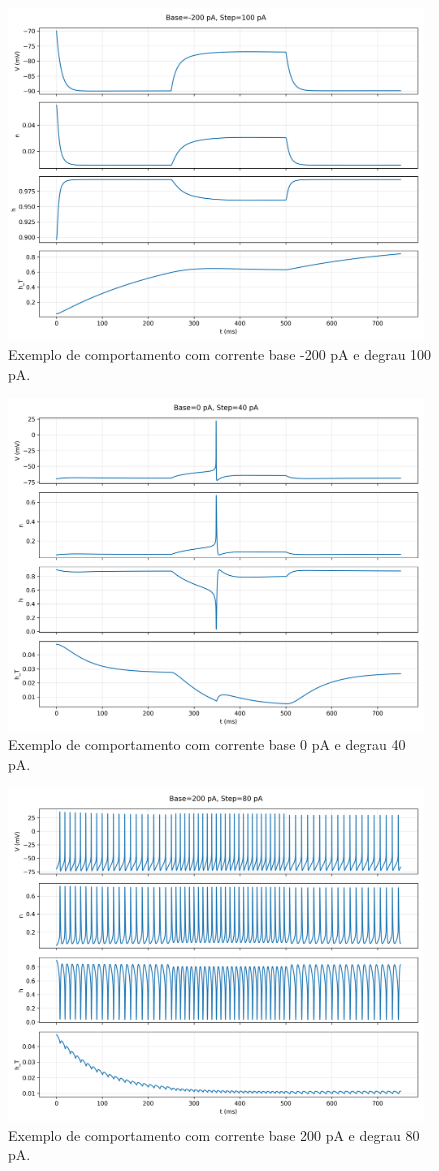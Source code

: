 \documentclass[english,11pt,a4paper]{article}
\begin{document}
	\begin{figure}[H]
		\centering
		\includegraphics[width=11cm]{../figures/ex_2b_traces_base-200_step100.png}	
		\caption{Exemplo de comportamento com corrente base -200 pA e degrau 100 pA.}
	\end{figure}	
	\begin{figure}[H]
	\centering
	\includegraphics[width=11cm]{../figures/ex_2b_traces_base0_step40.png}	
	\caption{Exemplo de comportamento com corrente base 0 pA e degrau 40 pA.}
	\end{figure}	
	\begin{figure}[H]
	\centering
	\includegraphics[width=11cm]{../figures/ex_2b_traces_base200_step80.png}	
	\caption{Exemplo de comportamento com corrente base 200 pA e degrau 80 pA.}
	\end{figure}
	
	
\end{document}
